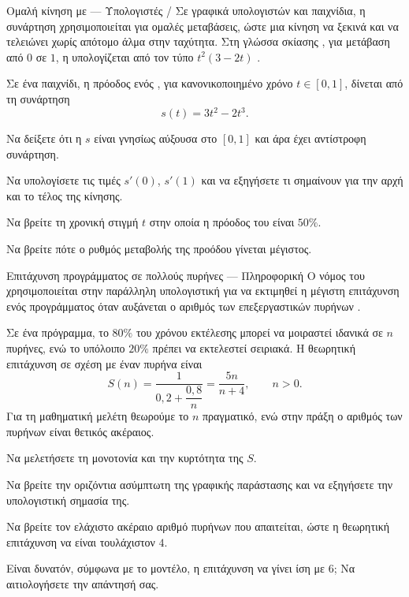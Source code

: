 \begin{problhma}{Ομαλή κίνηση με  --- Υπολογιστές / }
Σε γραφικά υπολογιστών και παιχνίδια, η συνάρτηση 
χρησιμοποιείται για ομαλές μεταβάσεις, ώστε μια κίνηση να ξεκινά και να
τελειώνει χωρίς απότομο άλμα στην ταχύτητα. Στη γλώσσα σκίασης
, για μετάβαση από \(0\) σε \(1\), η 
υπολογίζεται από τον τύπο \(t^2(3-2t)\) \cite{glslSmoothstepDocs}.

Σε ένα παιχνίδι, η πρόοδος ενός , για κανονικοποιημένο χρόνο
\(t\in[0,1]\), δίνεται από τη συνάρτηση
\[
  s(t)=3t^2-2t^3.
\]
\begin{alist}
  \item Να δείξετε ότι η \(s\) είναι γνησίως αύξουσα στο \([0,1]\) και
        άρα έχει αντίστροφη συνάρτηση.
  \item Να υπολογίσετε τις τιμές \(s'(0)\), \(s'(1)\) και να εξηγήσετε
        τι σημαίνουν για την αρχή και το τέλος της κίνησης.
  \item Να βρείτε τη χρονική στιγμή \(t\) στην οποία η πρόοδος του
         είναι \(50\%\).
  \item Να βρείτε πότε ο ρυθμός μεταβολής της προόδου γίνεται μέγιστος.
\end{alist}
\end{problhma}

\begin{problhma}{Επιτάχυνση προγράμματος σε πολλούς πυρήνες --- Πληροφορική}
Ο νόμος του  χρησιμοποιείται στην παράλληλη υπολογιστική για
να εκτιμηθεί η μέγιστη επιτάχυνση ενός προγράμματος όταν αυξάνεται ο
αριθμός των επεξεργαστικών πυρήνων \cite{amdahlLawParallelComputing}.

Σε ένα πρόγραμμα, το \(80\%\) του χρόνου εκτέλεσης μπορεί να μοιραστεί
ιδανικά σε \(n\) πυρήνες, ενώ το υπόλοιπο \(20\%\) πρέπει να εκτελεστεί
σειριακά. Η θεωρητική επιτάχυνση σε σχέση με έναν πυρήνα είναι
\[
  S(n)=\frac{1}{0{,}2+\dfrac{0{,}8}{n}}
      =\frac{5n}{n+4},
  \qquad n>0.
\]
Για τη μαθηματική μελέτη θεωρούμε το \(n\) πραγματικό, ενώ στην πράξη ο
αριθμός των πυρήνων είναι θετικός ακέραιος.
\begin{alist}
  \item Να μελετήσετε τη μονοτονία και την κυρτότητα της \(S\).
  \item Να βρείτε την οριζόντια ασύμπτωτη της γραφικής παράστασης και
        να εξηγήσετε την υπολογιστική σημασία της.
  \item Να βρείτε τον ελάχιστο ακέραιο αριθμό πυρήνων που απαιτείται,
        ώστε η θεωρητική επιτάχυνση να είναι τουλάχιστον \(4\).
  \item Είναι δυνατόν, σύμφωνα με το μοντέλο, η επιτάχυνση να γίνει
        ίση με \(6\); Να αιτιολογήσετε την απάντησή σας.
\end{alist}
\end{problhma}
